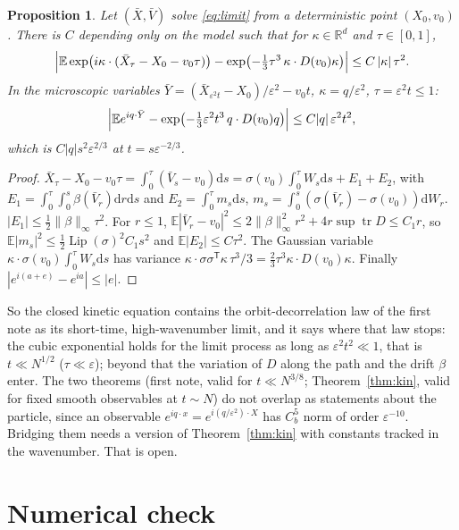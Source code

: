 \documentclass[11pt]{article}
\newcommand{\dd}{\mathrm{d}}
\newcommand{\E}{\mathbb{E}}
\newcommand{\eps}{\varepsilon}
\newcommand{\R}{\mathbb{R}}
\newcommand{\nrm}[2]{\|#1\|_{#2}}
\newtheorem{proposition}[theorem]{Proposition}
\theoremstyle{remark}
\begin{document}
\begin{proposition}\label{prop:match}
Let $(\bar X,\bar V)$ solve \eqref{eq:limit} from a deterministic point
$(X_0,v_0)$. There is $C$ depending only on the model such that for
$\kappa\in\R^d$ and $\tau\in[0,1]$,
\[
  \Bigl|\E\exp\bigl(i\kappa\cdot(\bar X_\tau-X_0-v_0\tau)\bigr)
   -\exp\bigl(-\tfrac13\tau^3\,\kappa\cdot D(v_0)\kappa\bigr)\Bigr|
  \le C\,|\kappa|\,\tau^2 .
\]
In the microscopic variables $\bar Y=(\bar X_{\eps^2t}-X_0)/\eps^2-v_0t$,
$\kappa=q/\eps^2$, $\tau=\eps^2t\le1$:
\[
  \Bigl|\E e^{iq\cdot\bar Y}-\exp\bigl(-\tfrac13\eps^2t^3\,q\cdot D(v_0)q\bigr)\Bigr|
  \le C|q|\,\eps^2t^2,
\]
which is $C|q|s^2\eps^{2/3}$ at $t=s\eps^{-2/3}$.
\end{proposition}

\begin{proof}
$\bar X_\tau-X_0-v_0\tau=\int_0^\tau(\bar V_s-v_0)\dd s=\sigma(v_0)\int_0^\tau
W_s\dd s+E_1+E_2$, with $E_1=\int_0^\tau\!\int_0^s\beta(\bar V_r)\dd r\dd s$
and $E_2=\int_0^\tau m_s\dd s$, $m_s=\int_0^s(\sigma(\bar V_r)-\sigma(v_0))
\dd W_r$. $|E_1|\le\frac12\nrm{\beta}{\infty}\tau^2$. For $r\le1$,
$\E|\bar V_r-v_0|^2\le2\nrm{\beta}{\infty}^2r^2+4r\sup\operatorname{tr}D\le
C_1r$, so $\E|m_s|^2\le\frac12\operatorname{Lip}(\sigma)^2C_1s^2$ and
$\E|E_2|\le C\tau^2$. The Gaussian variable $\kappa\cdot\sigma(v_0)\int_0^\tau
W_s\dd s$ has variance $\kappa\cdot\sigma\sigma^{\mathsf T}\kappa\,\tau^3/3
=\tfrac23\tau^3\kappa\cdot D(v_0)\kappa$. Finally $|e^{i(a+e)}-e^{ia}|\le|e|$.
\end{proof}

So the closed kinetic equation contains the orbit-decorrelation law of the
first note as its short-time, high-wavenumber limit, and it says where that
law stops: the cubic exponential holds for the limit process as long as
$\eps^2t^2\ll1$, that is $t\ll N^{1/2}$ ($\tau\ll\eps$); beyond that the
variation of $D$ along the path and the drift $\beta$ enter. The two
theorems (first note, valid for $t\ll N^{3/8}$; Theorem~\ref{thm:kin}, valid
for fixed smooth observables at $t\sim N$) do not overlap as statements
about the particle, since an observable $e^{iq\cdot x}=e^{i(q/\eps^2)\cdot
X}$ has $C_b^5$ norm of order $\eps^{-10}$. Bridging them needs a version
of Theorem~\ref{thm:kin} with constants tracked in the wavenumber. That is
open.

\section{Numerical check}
\end{document}

